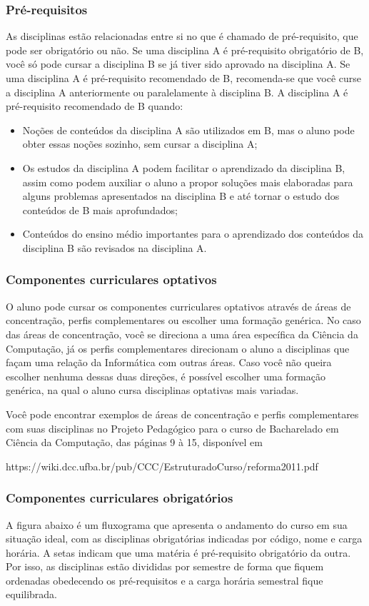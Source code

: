 \subsubsection{Pré-requisitos}
 As disciplinas estão relacionadas entre si no que é chamado de pré-requisito, que pode ser obrigatório ou não. Se uma disciplina A é pré-requisito obrigatório de B, você só pode cursar a disciplina B se já tiver sido aprovado na disciplina A. Se uma disciplina A é pré-requisito recomendado de B, recomenda-se que você curse a disciplina A anteriormente ou paralelamente à disciplina B. A disciplina A é pré-requisito recomendado de B quando: 
\begin{itemize}
    \item Noções de conteúdos da disciplina A são utilizados em B, mas o aluno pode obter essas noções sozinho, sem cursar a disciplina A;
    \item Os estudos da disciplina A podem facilitar o aprendizado da disciplina B, assim como podem auxiliar o aluno a propor soluções mais elaboradas para alguns problemas apresentados na disciplina B e até tornar o estudo dos conteúdos de B mais aprofundados;
    \item Conteúdos do ensino médio importantes para o aprendizado dos conteúdos da disciplina B são revisados na disciplina A. 
\end{itemize}
\subsubsection{Componentes curriculares optativos}
O aluno pode cursar os componentes curriculares optativos através de áreas de concentração, perfis complementares ou escolher uma formação genérica. No caso das áreas de concentração, você se direciona a uma área específica da Ciência da Computação, já os perfis complementares direcionam o aluno a disciplinas que façam uma relação da Informática com outras áreas. Caso você não queira escolher nenhuma dessas duas direções, é possível escolher uma formação genérica, na qual o aluno cursa disciplinas optativas mais variadas.

Você pode encontrar exemplos de áreas de concentração e perfis complementares com suas disciplinas no Projeto Pedagógico para o curso de Bacharelado em Ciência da Computação, das páginas 9 à 15, disponível em

https://wiki.dcc.ufba.br/pub/CCC/EstruturadoCurso/reforma2011.pdf
\subsubsection{Componentes curriculares obrigatórios}
 A figura abaixo é um fluxograma que apresenta o andamento do curso em sua situação ideal, com as disciplinas obrigatórias indicadas por código, nome e carga horária. A setas indicam que uma matéria é pré-requisito obrigatório da outra. Por isso, as disciplinas estão divididas por semestre de forma que fiquem ordenadas obedecendo os pré-requisitos e a carga horária semestral fique equilibrada.

